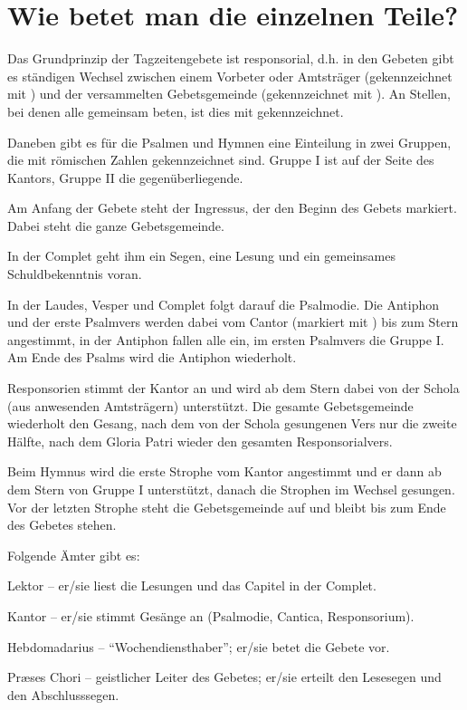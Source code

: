 \section*{Wie betet man die einzelnen Teile?}
Das Grundprinzip der Tagzeitengebete ist responsorial, d.h. in den Gebeten gibt
es ständigen Wechsel zwischen einem Vorbeter oder Amtsträger (gekennzeichnet mit
\Vbar) und der versammelten Gebetsgemeinde (gekennzeichnet mit \Rbar). An
Stellen, bei denen alle gemeinsam beten, ist dies mit \Abar gekennzeichnet.\par
Daneben gibt es für die Psalmen und Hymnen eine Einteilung in zwei Gruppen, die
mit römischen Zahlen gekennzeichnet sind. Gruppe I ist auf der Seite des
Kantors, Gruppe II die gegenüberliegende.\par
Am Anfang der Gebete steht der Ingressus, der den Beginn des Gebets markiert.
Dabei steht die ganze Gebetsgemeinde.\par
In der Complet geht ihm ein Segen, eine Lesung und ein gemeinsames
Schuldbekenntnis voran.\par
In der Laudes, Vesper und Complet folgt darauf die Psalmodie. Die Antiphon und
der erste Psalmvers werden dabei vom Cantor (markiert mit \Vbar) bis zum Stern
angestimmt, in der Antiphon fallen alle ein, im ersten Psalmvers die Gruppe I.
Am Ende des Psalms wird die Antiphon wiederholt.\par
Responsorien stimmt der Kantor an und wird ab dem Stern dabei von der Schola
(aus anwesenden Amtsträgern) unterstützt. Die gesamte Gebetsgemeinde wiederholt
den Gesang, nach dem von der Schola gesungenen Vers nur die zweite Hälfte, nach
dem Gloria Patri wieder den gesamten Responsorialvers.\par
Beim Hymnus wird die erste Strophe vom Kantor angestimmt und er dann ab dem
Stern von Gruppe I unterstützt, danach die Strophen im Wechsel gesungen. Vor der
letzten Strophe steht die Gebetsgemeinde auf und bleibt bis zum Ende des Gebetes
stehen.\par
Folgende Ämter gibt es:\par
\begin{asparaenum}
\item Lektor -- er/sie liest die Lesungen und das Capitel in der Complet.
\item Kantor -- er/sie stimmt Gesänge an (Psalmodie, Cantica, Responsorium).
\item Hebdomadarius -- \enquote{Wochendiensthaber}; er/sie betet die Gebete vor.
\item Præses Chori -- geistlicher Leiter des Gebetes; er/sie erteilt den
Lesesegen und den Abschlusssegen.
\end{asparaenum}
